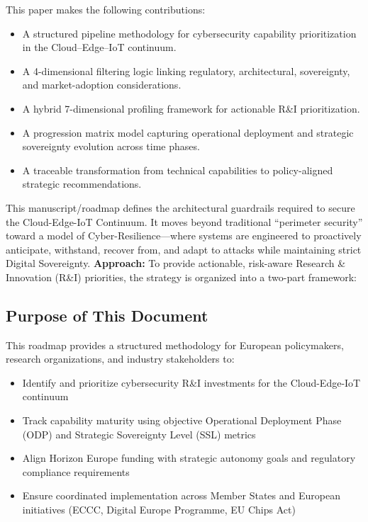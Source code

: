 \documentclass{ieeeaccess}
\begin{document}
This paper makes the following contributions:
\begin{itemize}
    \item A structured pipeline methodology for cybersecurity capability prioritization in the Cloud--Edge--IoT continuum.
    \item A 4-dimensional filtering logic linking regulatory, architectural, sovereignty, and market-adoption considerations.
    \item A hybrid 7-dimensional profiling framework for actionable R\&I prioritization.
    \item A progression matrix model capturing operational deployment and strategic sovereignty evolution across time phases.
    \item A traceable transformation from technical capabilities to policy-aligned strategic recommendations.
\end{itemize}
\newpage

This manuscript/roadmap defines the architectural guardrails required to secure the Cloud-Edge-IoT Continuum. It moves beyond traditional ``perimeter security''  toward a model of Cyber-Resilience---where systems are engineered to proactively anticipate, withstand, recover from, and adapt to attacks while maintaining strict Digital Sovereignty.
\textbf{Approach:} To provide actionable, risk-aware Research \& Innovation (R\&I) priorities, the strategy is organized into a two-part framework:
 

\subsection*{Purpose of This Document}
This roadmap provides a structured methodology for European policymakers, research organizations, and industry stakeholders to:
\begin{itemize}
    \item Identify and prioritize cybersecurity R\&I investments for the Cloud-Edge-IoT continuum
    \item Track capability maturity using objective Operational Deployment Phase (ODP) and Strategic Sovereignty Level (SSL) metrics
    \item Align Horizon Europe funding with strategic autonomy goals and regulatory compliance requirements
    \item Ensure coordinated implementation across Member States and European initiatives (ECCC, Digital Europe Programme, EU Chips Act)
\end{itemize}
\end{document}
